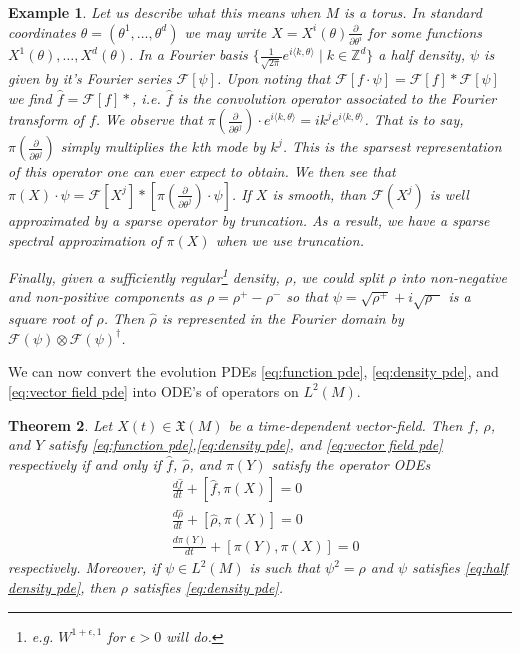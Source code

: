 \documentclass[12pt]{amsart}
\newcommand{\pder}[2]{\ensuremath{\frac{ \partial #1}{\partial #2}}}
\newtheorem{thm}{Theorem}[section]
\newtheorem{example}[thm]{Example}
\begin{document}
\begin{example}
Let us describe what this means when $M$ is a torus.
In standard coordinates $\theta = (\theta^{1},\dots,\theta^{d})$ we may write $X = X^{i}(\theta) \frac{\partial}{\partial \theta^{i}}$ for some functions $X^{1}(\theta),\dots,X^{d}(\theta)$.
In a Fourier basis $\{ \frac{1}{\sqrt{2\pi}} e^{ i \langle k , \theta \rangle}   \mid k \in \mathbb{Z}^{d} \}$ 
a half density, $\psi$ is given by it's Fourier series $\mathcal{F}[\psi]$.
Upon noting that $\mathcal{F}[ f \cdot \psi] = \mathcal{F}[f] * \mathcal{F}[\psi]$
we find $\hat{f} = \mathcal{F}[f] * $, i.e. $\hat{f}$ is the convolution operator associated to the Fourier transform of $f$.
We observe that $\pi \left( \pder{}{\theta^{j}} \right) \cdot e^{i \langle k , \theta \rangle}  = i k^{j} e^{i \langle k,\theta\rangle}$.
That is to say, $\pi \left( \pder{}{\theta^{j}} \right)$ simply multiplies the $k$th mode by $k^{j}$.
This is the sparsest representation of this operator one can ever expect to obtain.
We then see that $\pi(X) \cdot \psi = \mathcal{F}[X^{j}] *  [ \pi \left( \pder{}{\theta^{j}} \right) \cdot \psi ]$.
If $X$ is smooth, than $\mathcal{F}(X^{j})$ is well approximated by a sparse operator by truncation.
As a result, we have a sparse spectral approximation of $\pi(X)$ when we use truncation.

Finally, given a sufficiently regular\footnote{e.g. $W^{1+\epsilon,1}$ for $\epsilon >0$ will do.} density, $\rho$,  we could 
split $\rho$ into non-negative and non-positive components as $\rho = \rho^{+} - \rho^{-}$
so that $\psi = \sqrt{\rho^{+}} + i \sqrt{\rho^{-}}$ is a square root of $\rho$.
Then $\hat{\rho}$ is represented in the Fourier domain by $\mathcal{F}(\psi) \otimes \mathcal{F}(\psi)^{\dagger}$.
\end{example}

We can now convert the evolution PDEs \eqref{eq:function pde}, \eqref{eq:density pde}, and \eqref{eq:vector field pde}
into ODE's of operators on $L^{2}(M)$.

\begin{thm} \label{thm:quantize}
	Let $X(t) \in \mathfrak{X}(M)$ be a time-dependent vector-field.
	Then $f$, $\rho$, and $Y$ satisfy \eqref{eq:function pde},\eqref{eq:density pde}, and \eqref{eq:vector field pde} respectively
	if and only if $\hat{f}$, $\hat{\rho}$, and $\pi(Y)$ satisfy the operator ODEs
	\begin{align}
		&\frac{d \hat{f} }{dt} + [ \hat{f} , \pi(X) ] = 0 \label{eq:quantum observable ode} \\
		&\frac{d \hat{\rho} }{dt} + [ \hat{\rho} , \pi(X) ] = 0 \label{eq:quantum density ode} \\
		&\frac{d \pi(Y) }{dt} + [ \pi(Y), \pi(X) ] = 0 \label{eq:quantum vf ode}
	\end{align}
	respectively.
	Moreover, if $\psi \in L^{2}(M)$ is such that $\psi^{2} = \rho$ and $\psi$ satisfies \eqref{eq:half density pde}, then $\rho$ satisfies \eqref{eq:density pde}.
\end{thm}
\end{document}
